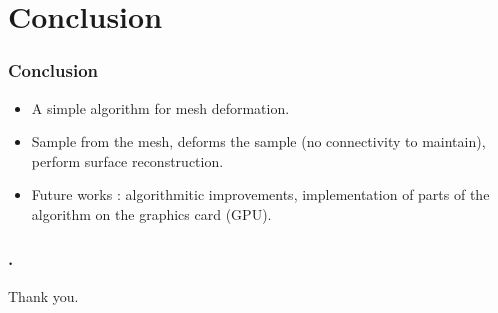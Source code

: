 \documentclass{beamer}
\begin{document}
\section{Conclusion}
\begin{frame}
\frametitle{Conclusion}
\Large
\begin{itemize}
\item A simple algorithm for mesh deformation.
\item Sample from the mesh, deforms the sample (no connectivity to maintain), perform surface
reconstruction.
\item Future works : algorithmitic improvements, implementation of parts of the algorithm on the graphics card (GPU).
\end{itemize}
\end{frame}
\begin{frame}
\frametitle{ {\color{blue}.}}
\centering
\Large
Thank you.

\end{frame}
\end{document}
